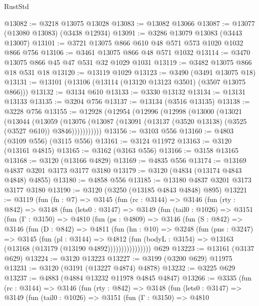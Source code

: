 \begin{lexlean}{RustStd}
\begin{coremodule}
@13082 := @3218 @13075 @13028
@13083 := @13082 @13066
@13087 := @13077 (@13080 @13083) (@3438 @12934)
@13091 := @3286 @13079 @13083 (@3443 @13007)
@13101 := @3721 @13075 @866 @610 @48 @571 @573 @1020 @1032 @866 @756
@13106 := @3461 @13075 @866 @48 @571 @1032
@13114 := @3470 @13075 @866 @45 @47 @531 @32 @1029 @1031
@13119 := @3482 @13075 @866 @18 @531 @18
@13120 := @13119 @1029
@13123 := @3490 (@3491 @13075 @18)
@13131 := @13101 (@13106 (@13114 (@13120 @13123 @3501) (@3507 @13075 @866)))
@13132 := @3134 @610
@13133 := @3330 @13132
@13134 := @13131 @13133
@13135 := @3204 @756
@13137 := @13134 (@3516 @13135)
@13138 := @3228 @756
@13155 := @12928
    (@12954
      (@12996
        (@12998
          (@13000
            (@13021
              (@13044
                (@13059
                  (@13076
                    (@13087 (@13091 (@13137 (@3520 @13138) (@3525 (@3527 @610)) @3846)))))))))))
@13156 := @3103 @556
@13160 := @4803 (@3109 @556) (@3115 @556)
@13161 := @3124 @11972
@13163 := @3120 (@13161 @4815)
@13165 := @3162 (@3163 @556)
@13166 := @3158 @13165
@13168 := @3120 (@13166 @4829)
@13169 := @4835 @556
@13174 := @13169 @4837 @3201 @3173 @3177 @3180
@13179 := @3120 (@4834 (@13174 @4843 @4848) @4855)
@13180 := @4858 @556
@13185 := @13180 @4837 @3201 @3173 @3177 @3180
@13190 := @3120 (@3250 (@13185 @4843 @4848) @895)
@13221 := @3119
    (fun (fn : @7) =>
    @3145
      (fun (rc : @3144) =>
      @3146
        (fun (rty : @842) =>
        @3148
          (fun (lets0 : @3147) =>
          @3149
            (fun (tail0 : @1026) =>
            @3151
              (fun (Γ : @3150) =>
              @4810
                (fun (ps : @4809) =>
                @3146
                  (fun (S : @842) =>
                  @3146
                    (fun (D : @842) =>
                    @4811
                      (fun (hn : @10) =>
                      @3248
                        (fun (pns : @3247) =>
                        @3145
                          (fun (pl : @3144) =>
                          @4812
                            (fun (bodyL : @3154) =>
                            @13163 (@13168 (@13179 (@13190 @4892))))))))))))))))
    @629
@13223 := @13161 (@3137 @629)
@13224 := @3120 @13223
@13227 := @3199 (@3200 @629) @11975
@13231 := @3120 (@3191 (@13227 @4874) @4878)
@13232 := @3225 @629
@13237 := @4883 (@4884 @13232 @11978 @4845 @4847)
@13266 := @3335
    (fun (rc : @3144) =>
    @3146
      (fun (rty : @842) =>
      @3148
        (fun (lets0 : @3147) =>
        @3149
          (fun (tail0 : @1026) =>
          @3151
            (fun (Γ : @3150) =>
            @4810

\end{coremodule}
\end{lexlean}
